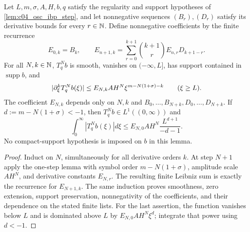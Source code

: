 \begin{lemma}
  \label{lem:c04_osc_ibp_iteration}
  Let $L,m,\sigma,A,H,b,q$ satisfy the regularity and support hypotheses of
  \cref{lem:c04_osc_ibp_step}, and let nonnegative sequences $(B_r),(D_r)$ satisfy
  its derivative bounds for every $r\in\mathbb{N}$.
  Define nonnegative coefficients by the finite recurrence
  \[
    E_{0,k}=B_k,\qquad
    E_{n+1,k}=\sum_{r=0}^{k+1}\binom{k+1}{r}E_{n,r}D_{k+1-r}.
  \]
  For all $N,k\in\mathbb{N}$, $T_q^Nb$ is smooth, vanishes on $(-\infty,L]$,
  has support contained in $\operatorname{supp}b$, and
  \[
    |\partial_\xi^kT_q^Nb(\xi)|
       \le E_{N,k}AH^N\xi^{m-N(1+\sigma)-k}\qquad(\xi\ge L).
  \]
  The coefficient $E_{N,k}$ depends only on $N,k$ and
  $B_0,\ldots,B_{N+k},D_0,\ldots,D_{N+k}$.
  If $d:=m-N(1+\sigma)<-1$, then $T_q^Nb\in L^1((0,\infty))$ and
  \[
    \int_0^\infty|T_q^Nb(\xi)|d\xi
      \le E_{N,0}AH^N\frac{L^{d+1}}{-d-1}.
  \]
  No compact-support hypothesis is imposed on $b$ in this lemma.
\end{lemma}
\begin{proof}
  Induct on $N$, simultaneously for all derivative orders $k$.
  At step $N+1$ apply the one-step lemma with symbol order $m-N(1+\sigma)$,
  amplitude scale $AH^N$, and derivative constants $E_{N,r}$.
  The resulting finite Leibniz sum is exactly the recurrence for $E_{N+1,k}$.
  The same induction proves smoothness, zero extension, support preservation,
  nonnegativity of the coefficients, and their dependence on the stated finite lists.
  For the last assertion, the function vanishes below $L$ and is dominated above $L$
  by $E_{N,0}AH^N\xi^d$; integrate that power using $d<-1$.
\end{proof}

